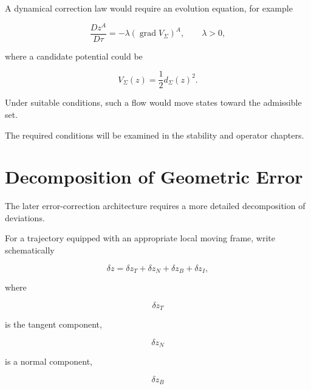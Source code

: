 \documentclass[12pt,oneside]{book}
\begin{document}
A dynamical correction law would require an evolution equation,
for example

\begin{equation}
    \frac{Dz^A}{D\tau}
    =
    -\lambda
    \left(
        \operatorname{grad}
        V_{\Sigma}
    \right)^A,
    \qquad
    \lambda>0,
    \label{eq:gradient-correction-flow}
\end{equation}

where a candidate potential could be

\begin{equation}
    V_{\Sigma}(z)
    =
    \frac{1}{2}
    d_{\Sigma}(z)^2.
    \label{eq:geometric-correction-potential}
\end{equation}

Under suitable conditions, such a flow would move states toward
the admissible set.

The required conditions will be examined in the stability and
operator chapters.


\section{Decomposition of Geometric Error}
\label{sec:geometric-error-components}

The later error-correction architecture requires a more detailed
decomposition of deviations.

For a trajectory equipped with an appropriate local moving
frame, write schematically

\begin{equation}
    \delta z
    =
    \delta z_T
    +
    \delta z_N
    +
    \delta z_B
    +
    \delta z_I,
    \label{eq:geometric-error-decomposition}
\end{equation}

where

\begin{equation}
    \delta z_T
\end{equation}

is the tangent component,

\begin{equation}
    \delta z_N
\end{equation}

is a normal component,

\begin{equation}
    \delta z_B
\end{equation}
\end{document}
